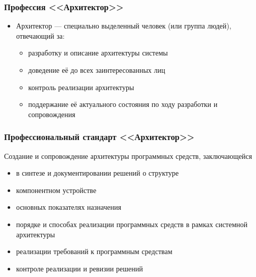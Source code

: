 \documentclass[xetex,mathserif,serif]{beamer}
\begin{document}
    \begin{frame}
        \frametitle{Профессия <<Архитектор>>}
        \begin{itemize}
            \item Архитектор --- специально выделенный человек (или группа людей), отвечающий за:
            \begin{itemize}
                \item разработку и описание архитектуры системы
                \item доведение её до всех заинтересованных лиц
                \item контроль реализации архитектуры
                \item поддержание её актуального состояния по ходу разработки и сопровождения
            \end{itemize}
        \end{itemize}
    \end{frame}

    \begin{frame}
        \frametitle{Профессиональный стандарт <<Архитектор>>}
        Создание и сопровождение архитектуры программных средств, заключающейся
        \begin{itemize}
            \item в синтезе и документировании решений о структуре
            \item компонентном устройстве
            \item основных показателях назначения
            \item порядке и способах реализации программных средств в рамках системной архитектуры
            \item реализации требований к программным средствам
            \item контроле реализации и ревизии решений
        \end{itemize}
    \end{frame}
\end{document}
